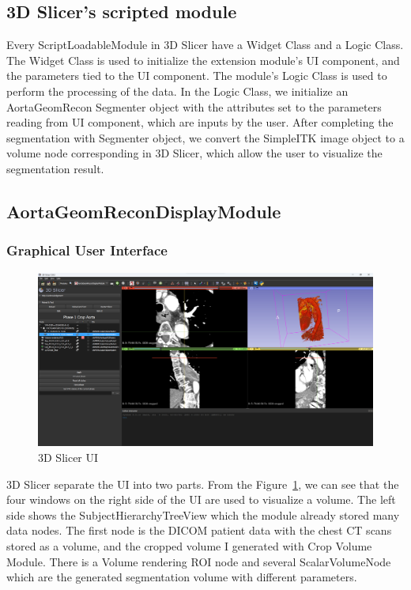 \subsection{3D Slicer's scripted module}

Every ScriptLoadableModule in 3D Slicer have a Widget Class and a Logic Class. The Widget Class is used to initialize the extension module's UI component, and the parameters tied to the UI component. The module's Logic Class is used to perform the processing of the data. In the Logic Class, we initialize an AortaGeomRecon Segmenter object with the attributes set to the parameters reading from UI component, which are inputs by the user. After completing the segmentation with Segmenter object, we convert the SimpleITK image object to a volume node corresponding in 3D Slicer, which allow the user to visualize the segmentation result. 

\subsection{AortaGeomReconDisplayModule}
\subsubsection{Graphical User Interface}

\begin{figure}[H]
    \centering
    \includegraphics[width=\textwidth]{figures/AGR/Slicer_UI.png}
    \caption[3D Slicer UI]{3D Slicer UI}
    \label{fig_slicer_ui}
\end{figure}

3D Slicer separate the UI into two parts. From the Figure~\ref{fig_slicer_ui}, we can see that the four windows on the right side of the UI are used to visualize a volume. The left side shows the SubjectHierarchyTreeView which the module already stored many data nodes. The first node is the DICOM patient data with the chest CT scans stored as a volume, and the cropped volume I generated with Crop Volume Module. There is a Volume rendering ROI node and several ScalarVolumeNode which are the generated segmentation volume with different parameters.

